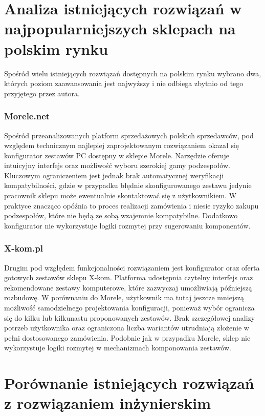 \documentclass[a4paper,twoside,12pt]{book}
\begin{document}
\section{Analiza istniejących rozwiązań w najpopularniejszych sklepach na polskim rynku}
Spośród wielu istniejących rozwiązań dostępnych na polskim rynku wybrano dwa, których poziom zaawansowania jest najwyższy i nie odbiega zbytnio od tego przyjętego przez autora.
\subsubsection{Morele.net}

Spośród przeanalizowanych platform sprzedażowych polskich sprzedawców, pod względem technicznym najlepiej zaprojektowanym rozwiązaniem okazał się konfigurator zestawów PC dostępny w sklepie Morele\cite{morele}. Narzędzie oferuje intuicyjny interfejs oraz możliwość wyboru szerokiej gamy podzespołów. Kluczowym ograniczeniem jest jednak brak automatycznej weryfikacji kompatybilności, gdzie w przypadku błędnie skonfigurowanego zestawu jedynie pracownik sklepu może ewentualnie skontaktować się z użytkownikiem. W praktyce znacząco opóźnia to proces realizacji zamówienia i niesie ryzyko zakupu podzespołów, które nie będą ze sobą wzajemnie kompatybilne. Dodatkowo konfigurator nie wykorzystuje logiki rozmytej przy sugerowaniu komponentów.

\subsubsection{X-kom.pl}

Drugim pod względem funkcjonalności rozwiązaniem jest konfigurator oraz oferta gotowych zestawów sklepu X-kom\cite{xkom}. Platforma udostępnia czytelny interfejs oraz rekomendowane zestawy komputerowe, które zazwyczaj umożliwiają późniejszą rozbudowę. W porównaniu do Morele\cite{morele}, użytkownik ma tutaj jeszcze mniejszą możliwość samodzielnego projektowania konfiguracji, ponieważ wybór ogranicza się do kilku lub kilkunastu proponowanych zestawów. Brak szczegółowej analizy potrzeb użytkownika oraz ograniczona liczba wariantów utrudniają złożenie w pełni dostosowanego zamówienia. Podobnie jak w przypadku Morele, sklep nie wykorzystuje logiki rozmytej w mechanizmach komponowania zestawów.


\section{Porównanie istniejących rozwiązań z rozwiązaniem inżynierskim}
\end{document}
